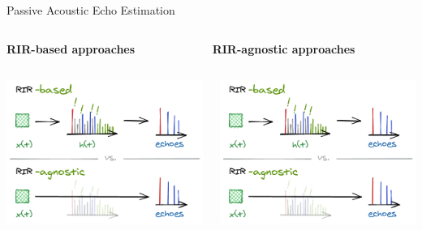 \begin{frame}[t]{Passive Acoustic Echo Estimation \hfill\faPalette}

        \vspace{.5em}
        \begin{columns}[T,onlytextwidth] %
            \begin{column}{.48\textwidth}
                \textbf{RIR-\alert{based} approaches}
            \end{column}
            \begin{column}{.48\textwidth}
                \textbf{RIR-\alert{agnostic} approaches}
            \end{column}%
        \end{columns}

        \vspace{.5em}
        \begin{columns}[onlytextwidth] %
            \begin{column}{.48\textwidth}
                \includegraphics[trim={0 31em 0 7em},clip,width=.9\textwidth]{./figures/based-agnostic.png}
            \end{column}
            \begin{column}{.48\textwidth}
                \includegraphics[trim={0 0 0 40em},clip,width=.9\textwidth]{./figures/based-agnostic.png}
            \end{column}%
        \end{columns}


\end{frame}
